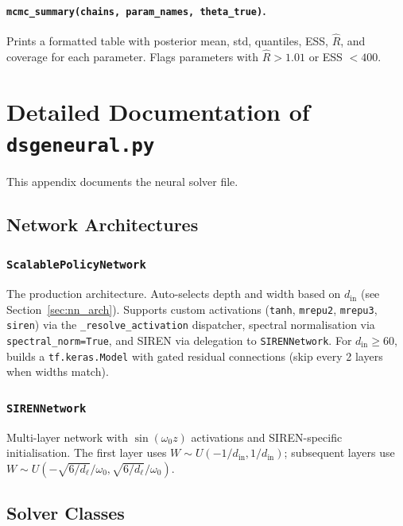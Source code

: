 \documentclass[11pt,a4paper]{article}
\theoremstyle{definition}
\newcommand{\code}[1]{\texttt{\color{codecolor}#1}}
\begin{document}
	\paragraph{\code{mcmc\_summary(chains, param\_names, theta\_true)}.}
	Prints a formatted table with posterior mean, std, quantiles, ESS, $\hat{R}$, and coverage for each parameter.
	Flags parameters with $\hat{R} > 1.01$ or ESS $< 400$.
	
	
	\section{Detailed Documentation of \code{dsgeneural.py}}
	\label{app:dsgeneural}
	
	This appendix documents the neural solver file.
	
	\subsection{Network Architectures}
	\label{app:architectures}
	
	\subsubsection{\code{ScalablePolicyNetwork}}
	
	The production architecture.
	Auto-selects depth and width based on $d_{\mathrm{in}}$ (see Section~\ref{sec:nn_arch}).
	Supports custom activations (\code{tanh}, \code{mrepu2}, \code{mrepu3}, \code{siren}) via the \code{\_resolve\_activation} dispatcher, spectral normalisation via \code{spectral\_norm=True}, and SIREN via delegation to \code{SIRENNetwork}.
	For $d_{\mathrm{in}} \geq 60$, builds a \code{tf.keras.Model} with gated residual connections (skip every 2 layers when widths match).
	
	\subsubsection{\code{SIRENNetwork}}
	
	Multi-layer network with $\sin(\omega_0 z)$ activations and SIREN-specific initialisation.
	The first layer uses $W \sim U(-1/d_{\mathrm{in}}, 1/d_{\mathrm{in}})$; subsequent layers use $W \sim U(-\sqrt{6/d_\ell}/\omega_0, \sqrt{6/d_\ell}/\omega_0)$.
	
	\subsection{Solver Classes}
	\label{app:solvers}
	
\end{document}
